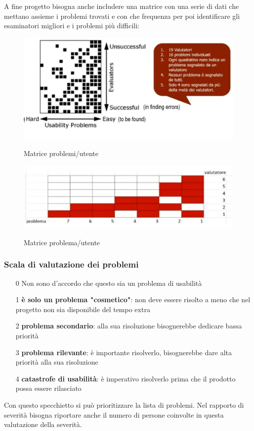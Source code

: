 \documentclass[11pt,a4paper]{book}
\begin{document}
A fine progetto bisogna anche includere una matrice con una serie di dati che mettano assieme i problemi trovati e con che frequenza per poi identificare gli esaminatori migliori e i problemi più difficili:
\begin{figure}[h!]
	\begin{center}
		\includegraphics[scale=0.6]{img/014.jpg}
		\caption{Matrice problemi/utente}
		\label{fig: 014}
		\includegraphics[scale=0.6]{img/015.jpg}
		\caption{Matrice problema/utente}
		\label{fig: 015}
	\end{center}
\end{figure}

\subsubsection{Scala di valutazione dei problemi}
\begin{itemize}
	\item[0] Non sono d'accordo che questo sia un problema di usabilità
	\item[1] \textbf{è solo un problema "cosmetico"}: non deve essere risolto a meno che nel progetto non sia disponibile del tempo extra 
	\item[2] \textbf{problema secondario}: alla sua risoluzione bisognerebbe dedicare bassa priorità
	\item[3] \textbf{problema rilevante}: è importante risolverlo, bisognerebbe dare alta priorità alla sua risoluzione
	\item[4] \textbf{catastrofe di usabilità}: è imperativo risolverlo prima che il prodotto possa essere rilasciato
\end{itemize}
Con questo specchietto si può prioritizzare la lista di problemi. Nel rapporto di severità bisogna riportare anche il numero di persone coinvolte in questa valutazione della severità.
\end{document}

